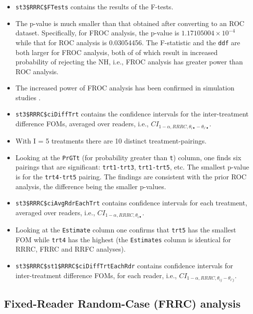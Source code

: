 \documentclass[
]{book}
\begin{document}
\begin{itemize}
\item
  \texttt{st3\$RRRC\$FTests} contains the results of the F-tests.
\item
  The p-value is much smaller than that obtained after converting to an ROC dataset. Specifically, for FROC analysis, the p-value is \ensuremath{1.17105004\times 10^{-4}} while that for ROC analysis is 0.03054456. The F-statistic and the \texttt{ddf} are both larger for FROC analysis, both of of which result in increased probability of rejecting the NH, i.e., FROC analysis has greater power than ROC analysis.
\item
  The increased power of FROC analysis has been confirmed in simulation studies \citep{RN1331}.
\item
  \texttt{st3\$RRRC\$ciDiffTrt} contains the confidence intervals for the inter-treatment difference FOMs, averaged over readers, i.e., \(CI_{1-\alpha,RRRC,\theta_{i \bullet} - \theta_{i' \bullet}}\).
\item
  With I = 5 treatments there are 10 distinct treatment-pairings.
\item
  Looking at the \texttt{PrGTt} (for probability greater than \texttt{t}) column, one finds six pairings that are significant: \texttt{trt1-trt3}, \texttt{trt1-trt5}, etc. The smallest p-value is for the \texttt{trt4-trt5} pairing. The findings are consistent with the prior ROC analysis, the difference being the smaller p-values.
\item
  \texttt{st3\$RRRC\$ciAvgRdrEachTrt} contains confidence intervals for each treatment, averaged over readers, i.e., \(CI_{1-\alpha,RRRC,\theta_{i \bullet}}\).
\item
  Looking at the \texttt{Estimate} column one confirms that \texttt{trt5} has the smallest FOM while \texttt{trt4} has the highest (the \texttt{Estimates} column is identical for RRRC, FRRC and RRFC analyses).
\item
  \texttt{st3\$RRRC\$st1\$RRRC\$ciDiffTrtEachRdr} contains confidence intervals for inter-treatment difference FOMs, for each reader, i.e., \(CI_{1-\alpha,RRRC,\theta_{i j} - \theta_{i' j}}\).
\end{itemize}

\hypertarget{or-applications-FRRC-dataset04-FROC}{%
\subsection{Fixed-Reader Random-Case (FRRC) analysis}\label{or-applications-FRRC-dataset04-FROC}}
\end{document}
